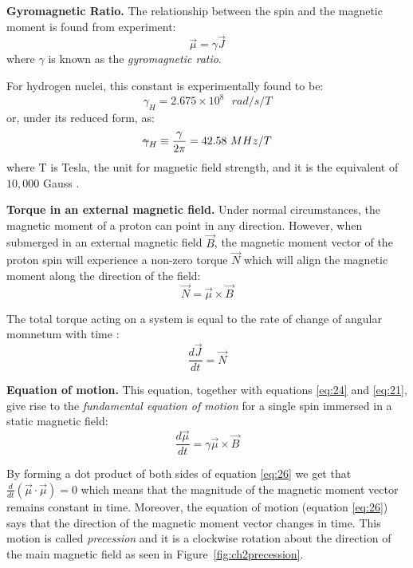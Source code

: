 \hfill

\textbf{Gyromagnetic Ratio.}
The relationship between the spin and the magnetic moment is found from experiment: 
\begin{equation} \label{eq:21}
    \vec{\mu} = \gamma \vec{J}
\end{equation}
where $\gamma$ is known as the \textit{gyromagnetic ratio}.

For hydrogen nuclei, this constant is experimentally found to be:
\begin{equation} \label{eq:22}
    \gamma_{H} = 2.675 \times 10^8 \text{  } rad/s/T
\end{equation}
or, under its reduced form, as:
\begin{equation} \label{eq:23}
    \text{\sout{$\gamma$}}_H \equiv \frac{\gamma}{2 \pi} = 42.58 \text{  } MHz/T
\end{equation}
where T is Tesla, the unit for magnetic field strength, and it is the equivalent of $10,000$ Gauss \cite{Haacke1999}.

\hfill

\textbf{Torque in an external magnetic field.}
Under normal circumstances, the magnetic moment of a proton can
point in any direction. 
However, when submerged in an external magnetic field $\vec{B}$, 
the magnetic moment vector of the proton spin will experience a 
non-zero torque $\vec{N}$ which will align the magnetic 
moment along the direction of the field:
\begin{equation} \label{eq:24}
    \vec{N} = \vec{\mu} \times \vec{B}
\end{equation}

The total torque acting on a system is equal to the 
rate of change of angular momnetum with time \cite{Haacke1999}:
\begin{equation} \label{eq:25}
    \frac{d\vec{J}}{dt} = \vec{N}
\end{equation}

\hfill

\textbf{Equation of motion.} This equation, together with equations \ref{eq:24} and \ref{eq:21},
give rise to the \textit{fundamental equation of motion} for a single
spin immersed in a static magnetic field:
\begin{equation} \label{eq:26}
    \frac{d\vec{\mu}}{dt} = \gamma \vec{\mu} \times \vec{B}
\end{equation}

By forming a dot product of both sides of equation \ref{eq:26} we get that $\frac{d}{dt} (\vec{\mu} \cdot \vec{\mu}) = 0$ which means that the magnitude of the magnetic moment vector remains constant in time. Moreover, the equation of motion (equation \ref{eq:26}) says that the direction of the magnetic moment vector changes in time. This motion is called \textit{precession} and it is a clockwise rotation about the direction of the main magnetic field as seen in Figure~\ref{fig:ch2precession}.

